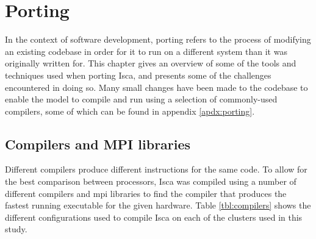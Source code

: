 \documentclass[a4paper,11pt]{report}
\begin{document}
\let\textcircled=\pgftextcircled
\chapter{Porting}
\label{chap:baselineexp}
In the context of software development, porting refers to the process of modifying an existing codebase in order for it to run on a different system than it was originally written for. This chapter gives an overview of some of the tools and techniques used when porting Isca, and presents some of the challenges encountered in doing so. Many small changes have been made to the codebase to enable the model to compile and run using a selection of commonly-used compilers, some of which can be found in appendix \ref{apdx:porting}. 

\section{Compilers and MPI libraries}
Different compilers produce different instructions for the same code. To allow for the best comparison between processors, Isca was compiled using a number of different compilers and \gls{mpi} libraries to find the compiler that produces the fastest running executable for the given hardware. Table \ref{tbl:compilers} shows the different configurations used to compile Isca on each of the clusters used in this study. 
\end{document}
